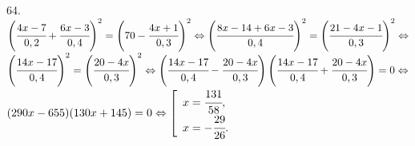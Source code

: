 64. $\left(\cfrac{4x-7}{0,2}+\cfrac{6x-3}{0,4}\right)^2=\left(70-\cfrac{4x+1}{0,3}\right)^2\Leftrightarrow
\left(\cfrac{8x-14+6x-3}{0,4}\right)^2=\left(\cfrac{21-4x-1}{0,3}\right)^2\Leftrightarrow$\\$
\left(\cfrac{14x-17}{0,4}\right)^2=\left(\cfrac{20-4x}{0,3}\right)^2\Leftrightarrow
\left(\cfrac{14x-17}{0,4}-\cfrac{20-4x}{0,3}\right)\left(\cfrac{14x-17}{0,4}+\cfrac{20-4x}{0,3}\right)=0\Leftrightarrow$\\
$(290x-655)(130x+145)=0\Leftrightarrow \left[\begin{array}{l}x=\cfrac{131}{58},\\ x=-\cfrac{29}{26}.\end{array}\right.$\\
